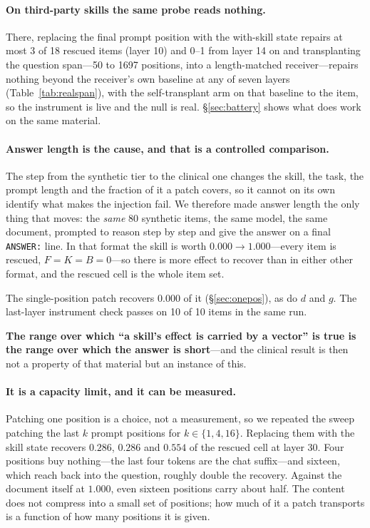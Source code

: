 \documentclass{article}
\newcommand{\dvec}{\ensuremath{d}}
\newcommand{\gvec}{\ensuremath{g}}
\begin{document}
\paragraph{On third-party skills the same probe reads nothing.} There,
replacing the final prompt position with the with-skill state repairs at most 3
of 18 rescued items (layer 10) and 0--1 from layer 14 on and transplanting the question span---50 to 1697 positions, into a
length-matched receiver---repairs nothing beyond the receiver's own baseline at
any of seven layers (Table~\ref{tab:realspan}), with the self-transplant arm on
that baseline to the item, so the instrument is live and the null is real.
\S\ref{sec:battery} shows what does work on the same material.

\paragraph{Answer length is the cause, and that is a controlled comparison.}
The step from the synthetic tier to the clinical one changes the skill, the
task, the prompt length and the fraction of it a patch covers, so it cannot on
its own identify what makes the injection fail. We therefore made answer length
the only thing that moves: the \emph{same} 80 synthetic items, the same model,
the same document, prompted to reason step by step and give the answer on a
final \texttt{ANSWER:} line. In that format the skill is worth $0.000 \to
1.000$---every item is rescued, $F=K=B=0$---so there is more effect to recover
than in either other format, and the rescued cell is the whole item set.

The single-position patch recovers $\mathbf{0.000}$ of it
(\S\ref{sec:onepos}), as do $\dvec$ and $\gvec$. The last-layer
instrument check passes on 10 of 10 items in the same run.





\textbf{The range over which ``a skill's effect is carried by a vector'' is true
is the range over which the answer is short}---and the clinical result is then
not a property of that material but an instance of this.

\paragraph{It is a capacity limit, and it can be measured.} Patching one
position is a choice, not a measurement, so we repeated the sweep patching the
last $k$ prompt positions for $k \in \{1,4,16\}$. Replacing them with the skill
state recovers $0.286$, $0.286$ and $\mathbf{0.554}$ of the rescued cell at
layer 30. Four positions buy nothing---the last four tokens are the chat
suffix---and sixteen, which reach back into the question, roughly double the
recovery. Against the document itself at $1.000$, even sixteen positions carry
about half. The content does not compress into a small set of positions; how
much of it a patch transports is a function of how many positions it is given.
\end{document}
